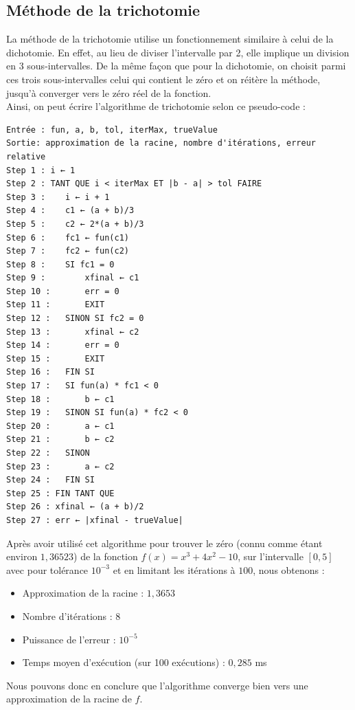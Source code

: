\documentclass[12pt]{article}
\begin{document}
\subsection{Méthode de la trichotomie}
\label{ref:trichotomie}
\noindent La méthode de la trichotomie utilise un fonctionnement similaire à celui de la dichotomie. En effet, au lieu de diviser l'intervalle par 2, elle implique un division en 3 sous-intervalles. De la même façon que pour la dichotomie, on choisit parmi ces trois sous-intervalles celui qui contient le zéro et on réitère la méthode, jusqu'à converger vers le zéro réel de la fonction.\\
Ainsi, on peut écrire l'algorithme de trichotomie selon ce pseudo-code :
\begin{verbatim}
Entrée : fun, a, b, tol, iterMax, trueValue
Sortie: approximation de la racine, nombre d'itérations, erreur relative
Step 1 : i ← 1
Step 2 : TANT QUE i < iterMax ET |b - a| > tol FAIRE
Step 3 :    i ← i + 1
Step 4 :    c1 ← (a + b)/3
Step 5 :    c2 ← 2*(a + b)/3
Step 6 :    fc1 ← fun(c1)
Step 7 :    fc2 ← fun(c2)
Step 8 :    SI fc1 = 0
Step 9 :        xfinal ← c1
Step 10 :       err = 0
Step 11 :       EXIT
Step 12 :   SINON SI fc2 = 0
Step 13 :       xfinal ← c2
Step 14 :       err = 0
Step 15 :       EXIT
Step 16 :   FIN SI
Step 17 :   SI fun(a) * fc1 < 0
Step 18 :       b ← c1
Step 19 :   SINON SI fun(a) * fc2 < 0
Step 20 :       a ← c1
Step 21 :       b ← c2
Step 22 :   SINON
Step 23 :       a ← c2
Step 24 :   FIN SI
Step 25 : FIN TANT QUE
Step 26 : xfinal ← (a + b)/2
Step 27 : err ← |xfinal - trueValue|
\end{verbatim}
\noindent Après avoir utilisé cet algorithme pour trouver le zéro (connu comme étant environ $1,36523$) de la fonction $f(x) = x^3 + 4x^2 -10$, sur l'intervalle $[0,5]$ avec pour tolérance $10^{-3}$ et en limitant les itérations à $100$, nous obtenons :
\begin{itemize}
    \item Approximation de la racine : $1,3653$
    \item Nombre d'itérations : $8$
    \item Puissance de l'erreur : $10^{-5}$
    \item Temps moyen d'exécution (sur 100 exécutions) : $0,285$ ms
\end{itemize}
Nous pouvons donc en conclure que l'algorithme converge bien vers une approximation de la racine de $f$.


\end{document}
